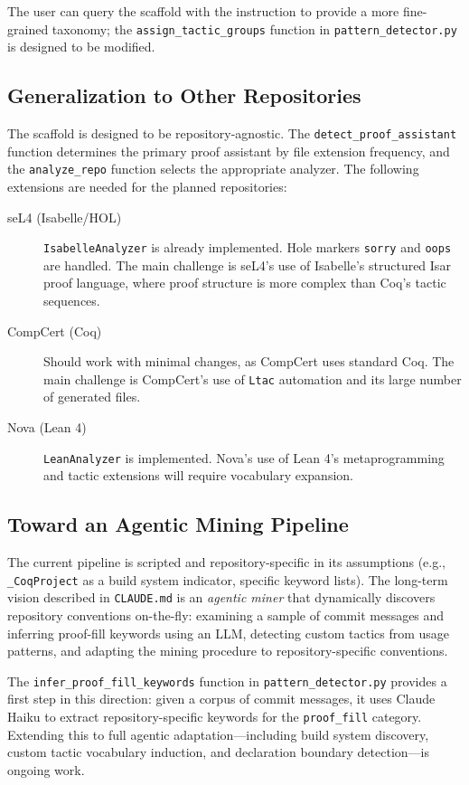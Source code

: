 \documentclass[11pt]{article}
\begin{document}
The user can query the scaffold with the instruction to provide a more fine-grained taxonomy; the \texttt{assign\_tactic\_groups} function in \texttt{pattern\_detector.py} is designed to be modified.

\subsection{Generalization to Other Repositories}

The scaffold is designed to be repository-agnostic. The \texttt{detect\_proof\_assistant} function determines the primary proof assistant by file extension frequency, and the \texttt{analyze\_repo} function selects the appropriate analyzer. The following extensions are needed for the planned repositories:

\begin{description}
  \item[seL4 (Isabelle/HOL)] \texttt{IsabelleAnalyzer} is already implemented. Hole markers \texttt{sorry} and \texttt{oops} are handled. The main challenge is seL4's use of Isabelle's structured Isar proof language, where proof structure is more complex than Coq's tactic sequences.
  \item[CompCert (Coq)] Should work with minimal changes, as CompCert uses standard Coq. The main challenge is CompCert's use of \texttt{Ltac} automation and its large number of generated files.
  \item[Nova (Lean 4)] \texttt{LeanAnalyzer} is implemented. Nova's use of Lean 4's metaprogramming and tactic extensions will require vocabulary expansion.
\end{description}

\subsection{Toward an Agentic Mining Pipeline}

The current pipeline is scripted and repository-specific in its assumptions (e.g., \texttt{\_CoqProject} as a build system indicator, specific keyword lists). The long-term vision described in \texttt{CLAUDE.md} is an \textit{agentic miner} that dynamically discovers repository conventions on-the-fly: examining a sample of commit messages and inferring proof-fill keywords using an LLM, detecting custom tactics from usage patterns, and adapting the mining procedure to repository-specific conventions.

The \texttt{infer\_proof\_fill\_keywords} function in \texttt{pattern\_detector.py} provides a first step in this direction: given a corpus of commit messages, it uses Claude Haiku to extract repository-specific keywords for the \texttt{proof\_fill} category. Extending this to full agentic adaptation---including build system discovery, custom tactic vocabulary induction, and declaration boundary detection---is ongoing work.
\end{document}
